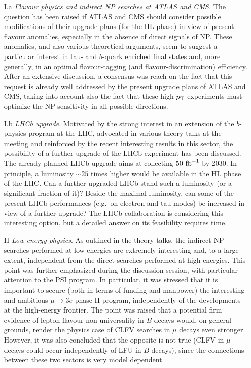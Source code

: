 \begin{enumerate}
\item[I.a] {\em Flavour physics and indirect NP searches at ATLAS and CMS.} 
The question has been raised if ATLAS and CMS should consider possible 
modifications of their upgrade plans (for the HL phase) in view of present flavour anomalies,
especially in the absence of direct signals of NP. These anomalies, and also various theoretical 
arguments, seem to suggest a particular interest in tau- and $b$-quark enriched final states
and, more generally, in an optimal flavour-tagging (and flavour-discrimination) efficiency. 
After an extensive discussion, a consensus was reach on the fact that this request
is already well addressed by the present upgrade plans of ATLAS and CMS,
taking into account also the fact that these high-$p_{\rm T}$ experiments 
must optimize the NP sensitivity in all possible directions.

\item[I.b] {\em  LHCb upgrade}. 
Motivated by the strong interest in an extension of the $b$-physics program at the LHC,
advocated in various theory talks at the meeting and reinforced by the recent interesting results in this sector, 
the possibility of a further upgrade of the LHCb experiment has been discussed.
The already planned LHCb upgrade aims at collecting $50~{\rm fb}^{-1}$ by 2030.
In principle, a luminosity $\sim25$ times higher 
would be available in the HL phase of the LHC. Can a further-upgraded LHCb stand such a luminosity (or a significant fraction of it)? 
Beside the maximal luminosity, can some of the present LHCb performances (e.g.\ on electron and tau modes) 
be increased in view of a further upgrade? 
The LHCb collaboration is considering this interesting option, but a detailed answer on its feasibility requires time.

\item[II] {\em Low-energy physics}. As outlined in the theory talks, the indirect NP searches performed at low-energies 
are extremely interesting and, to a large extent, independent from the direct searches performed at high energies. 
This point was further emphasized during the discussion session, with particular attention to the PSI program. 
In particular, it was stressed that it is important to secure (both in terms of funding and manpower) 
the interesting and ambitious $\mu \to 3 e$ phase-II program, independently of the developments 
at the high-energy frontier. The point was raised that a potential firm evidence of lepton-flavour non-universality
in $B$ decays would, on general grounds, render the physics case of  CLFV searches 
in $\mu$ decays even stronger.  However, it was also concluded that the opposite is not true 
(CLFV in  $\mu$  decays could occur independently of LFU in $B$ decays), since the connections between these 
two sectors is very model dependent.


\end{enumerate}
